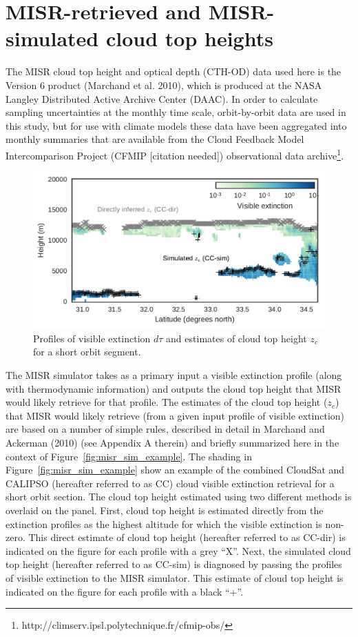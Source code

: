 \section{MISR-retrieved and MISR-simulated cloud top
heights}\label{sec:misrux5fretrievals}

The MISR cloud top height and optical depth (CTH-OD) data used here is
the Version 6 product (Marchand et al. 2010), which is produced at the
NASA Langley Distributed Active Archive Center (DAAC). In order to
calculate sampling uncertainties at the monthly time scale,
orbit-by-orbit data are used in this study, but for use with climate
models these data have been aggregated into monthly summaries that are
available from the Cloud Feedback Model Intercomparison Project (CFMIP
{[}citation needed{]}) observational data archive\footnote{http://climserv.ipsl.polytechnique.fr/cfmip-obs/}.

\begin{figure}[htbp]
\centering
\includegraphics{graphics/misr_sim_example.pdf}
\caption{\label{fig:misr_sim_example}Profiles of visible extinction
\(d\tau\) and estimates of cloud top height \(z_c\) for a short orbit
segment.}\label{fig:misrux5fsimux5fexample}
\end{figure}

The MISR simulator takes as a primary input a visible extinction profile
(along with thermodynamic information) and outputs the cloud top height
that MISR would likely retrieve for that profile. The estimates of the
cloud top height (\(z_c\)) that MISR would likely retrieve (from a given
input profile of visible extinction) are based on a number of simple
rules, described in detail in Marchand and Ackerman (2010) (see Appendix
A therein) and briefly summarized here in the context of
Figure~\ref{fig:misr_sim_example}. The shading in
Figure~\ref{fig:misr_sim_example} show an example of the combined
CloudSat and CALIPSO (hereafter referred to as CC) cloud visible
extinction retrieval for a short orbit section. The cloud top height
estimated using two different methods is overlaid on the panel. First,
cloud top height is estimated directly from the extinction profiles as
the highest altitude for which the visible extinction is non-zero. This
direct estimate of cloud top height (hereafter referred to as CC-dir) is
indicated on the figure for each profile with a grey ``X''. Next, the
simulated cloud top height (hereafter referred to as CC-sim) is
diagnosed by passing the profiles of visible extinction to the MISR
simulator. This estimate of cloud top height is indicated on the figure
for each profile with a black ``+''.

